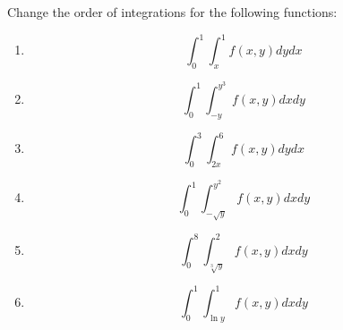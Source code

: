 \documentclass[openany]{book}
\begin{document}
\begin{prob}
    Change the order of integrations for the following functions:
    \begin{enumerate}
        \item \begin{equation*}
            \int_0^1\int_x^1f(x,y)dydx
        \end{equation*}
        \item \begin{equation*}
            \int_0^1\int_{-y}^{y^3}f(x,y)dxdy
        \end{equation*}
        \item \begin{equation*}
            \int_0^3\int_{2x}^6f(x,y)dydx
        \end{equation*}
        \item \begin{equation*}
            \int_0^1\int_{-\sqrt{y}}^{y^2}f(x,y)dxdy
        \end{equation*}
        \item \begin{equation*}
            \int_0^8\int_{\sqrt[3]{y}}^2f(x,y)dxdy
        \end{equation*}
        \item \begin{equation*}
            \int_0^1\int_{\ln y}^1f(x,y)dxdy
        \end{equation*}
    \end{enumerate}
\end{prob}
\end{document}

